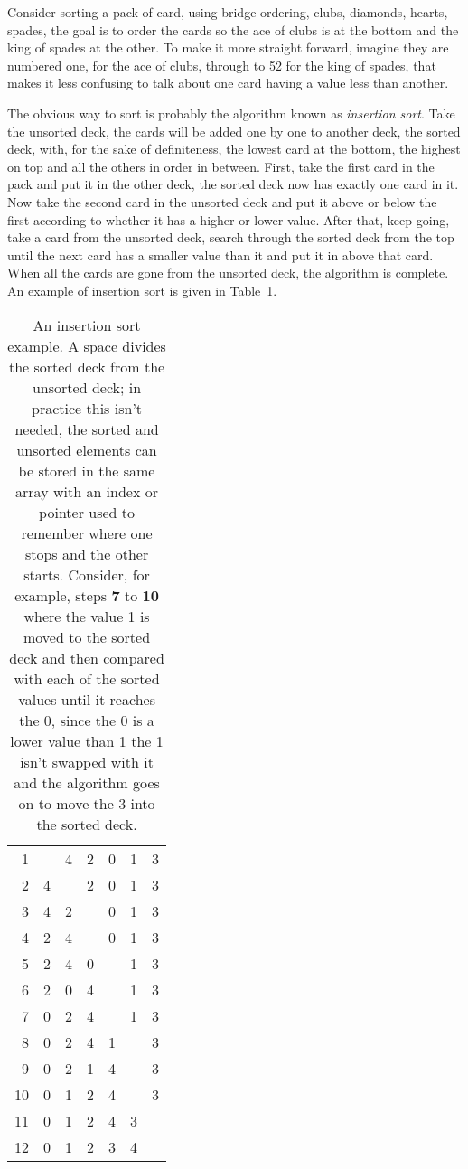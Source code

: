 \documentclass[11pt,a4paper]{scrartcl}
\begin{document}
Consider sorting a pack of card, using bridge ordering, clubs,
diamonds, hearts, spades, the goal is to order the cards so the ace of
clubs is at the bottom and the king of spades at the other. To make it
more straight forward, imagine they are numbered one, for the ace of
clubs, through to 52 for the king of spades, that makes it less
confusing to talk about one card having a value less than another.

The obvious way to sort is probably the algorithm known as
\emph{insertion sort}.  Take the unsorted deck, the cards will be
added one by one to another deck, the sorted deck, with, for the sake
of definiteness, the lowest card at the bottom, the highest on top and
all the others in order in between. First, take the first card in the
pack and put it in the other deck, the sorted deck now has exactly one
card in it. Now take the second card in the unsorted deck and put it
above or below the first according to whether it has a higher or lower
value. After that, keep going, take a card from the unsorted deck,
search through the sorted deck from the top until the next card has a
smaller value than it and put it in above that card. When all the
cards are gone from the unsorted deck, the algorithm is complete. An
example of insertion sort is given in Table~\ref{tab_insertsort}.

\begin{table}
\begin{tabular}{r|cccccc}
1&&4&2&0&1&3\\
2&4&&2&0&1&3\\
3&4&2&&0&1&3\\
4&2&4&&0&1&3\\
5&2&4&0&&1&3\\
6&2&0&4&&1&3\\
7&0&2&4&&1&3\\
8&0&2&4&1&&3\\
9&0&2&1&4&&3\\
10&0&1&2&4&&3\\
11&0&1&2&4&3&\\
12&0&1&2&3&4&
\end{tabular}
\caption{An insertion sort example. A space divides the sorted deck
  from the unsorted deck; in practice this isn't needed, the sorted
  and unsorted elements can be stored in the same array with an index
  or pointer used to remember where one stops and the other
  starts. Consider, for example, steps \textbf{ 7} to \textbf{ 10} where the
  value 1 is moved to the sorted deck and then compared with each of
  the sorted values until it reaches the 0, since the 0 is a lower
  value than 1 the 1 isn't swapped with it and the algorithm goes on
  to move the 3 into the sorted deck.\label{tab_insertsort}}
\end{table}
\end{document}
